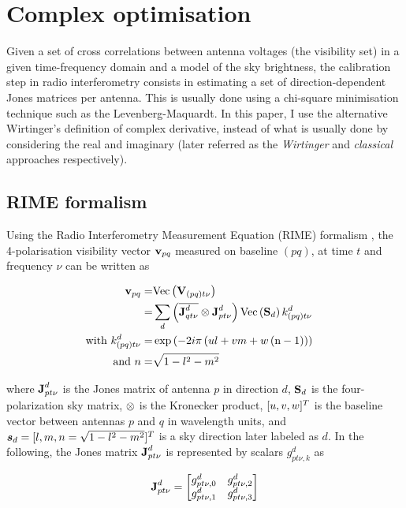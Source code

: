 \section{Complex optimisation}
\label{sec:Wirtinger}

Given a set of cross correlations between antenna voltages (the
visibility set) in a given time-frequency domain and a model of the sky brightness, the calibration
step in radio interferometry consists in estimating a set of
direction-dependent Jones matrices per antenna. This is usually done
using a chi-square minimisation technique such as the
Levenberg-Maquardt. In this paper, I use the alternative Wirtinger's
definition of complex derivative, instead of what is usually done by
considering the real and imaginary (later referred as the
{\it Wirtinger} and {\it classical} approaches respectively).

\subsection{RIME formalism}

Using the Radio Interferometry Measurement Equation (RIME) formalism
\citep[][]{Hamaker96}, the
4-polarisation visibility vector $\textbf{v}_{pq}$ measured on baseline $(pq)$,
at time $t$ and frequency $\nu$ can be written as


\begin{alignat}{2}
\label{eq:ME}
\textbf{v}_{pq}=&\text{Vec}\left(\textbf{V}_{(pq)t\nu}\right)&\\
=&\displaystyle\sum\limits_{d} \left(\overline{\textbf{J}^{d}_{qt\nu}}\otimes \textbf{J}^{d}_{pt\nu}\right)
\text{Vec}\left(\textbf{S}_d\right) k^{d}_{(pq)t\nu}\\
\text{with}\ k^{d}_{(pq)t\nu}=&\exp{\left(-2 i\pi
  \left(ul+vm+w\left(\text{n}-1\right)\right)\right)}\\
\text{and}\ n=&\sqrt{1-l^2-m^2}
\end{alignat}

\noindent where $\textbf{J}^{d}_{pt\nu}$ is the Jones matrix of antenna $p$
in direction $d$, $\textbf{S}_d$ is the four-polarization sky matrix, $\otimes$
is the Kronecker product, $[u,v,w]^T$ is the baseline vector between antennas
$p$ and $q$ in wavelength units, and
$\vec{s}_d=[\l,\m,\n=\sqrt{1-\l^2-\m^2}]^T$ is a sky direction later
labeled as $d$.
In the following, the Jones matrix $\textbf{J}^{d}_{pt\nu}$ is
represented by scalars $g^{d}_{pt\nu,k}$ as

\begin{equation}
\textbf{J}^{d}_{pt\nu}=
\begin{bmatrix}
g^{d}_{pt\nu,0} & g^{d}_{pt\nu,2} \\ 
g^{d}_{pt\nu,1} & g^{d}_{pt\nu,3} 
\end{bmatrix}
\end{equation}


